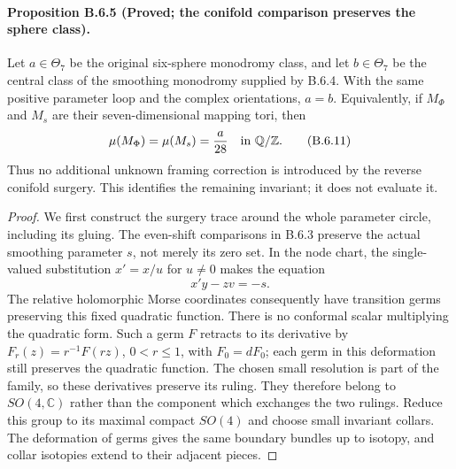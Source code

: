 \paragraph{Proposition B.6.5 (Proved; the conifold comparison preserves the sphere class).}
Let $a\in\Theta_7$ be the original six-sphere monodromy class,
and let $b\in\Theta_7$ be the central class of the smoothing
monodromy supplied by B.6.4. With the same positive parameter
loop and the complex orientations, $a=b$. Equivalently, if
$M_\Phi$ and $M_s$ are their seven-dimensional mapping tori, then
\[
 \mu(M_\Phi)=\mu(M_s)=\frac{a}{28}\quad\hbox{in }\mathbb Q/\mathbb Z.
 \tag{B.6.11}
\]
Thus no additional unknown framing correction is introduced by
the reverse conifold surgery. This identifies the remaining
invariant; it does not evaluate it.

\begin{proof}
We first construct the surgery trace around the whole parameter
circle, including its gluing. The even-shift comparisons in B.6.3
preserve the actual smoothing parameter $s$, not merely its zero
set. In the node chart, the single-valued substitution $x'=x/u$
for $u\ne0$ makes the equation
\[
 x'y-zv=-s.
\]
The relative holomorphic Morse coordinates consequently have
transition germs preserving this fixed quadratic function.
There is no conformal scalar multiplying the quadratic form.
Such a germ $F$ retracts to its derivative by
$F_r(z)=r^{-1}F(rz)$, $0<r\leq1$, with $F_0=dF_0$;
each germ in this deformation still preserves the quadratic
function. The chosen small resolution is part of the family,
so these derivatives preserve its ruling. They therefore belong
to $SO(4,\mathbb C)$ rather than the component which exchanges
the two rulings. Reduce this group to its maximal compact
$SO(4)$ and choose small invariant collars. The deformation of
germs gives the same boundary bundles up to isotopy, and collar
isotopies extend to their adjacent pieces.


\end{proof}
